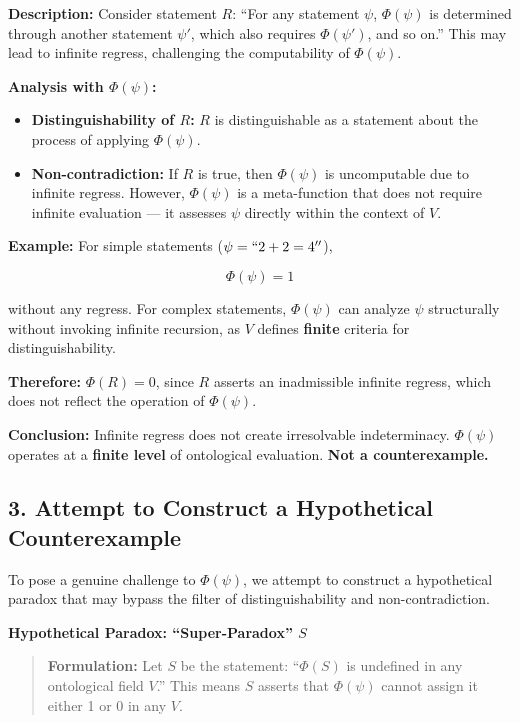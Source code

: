 \documentclass[12pt]{article}
\begin{document}
\textbf{Description:}  
Consider statement $R$: ``For any statement $\psi$, $\Phi(\psi)$ is determined through another statement $\psi'$, which also requires $\Phi(\psi')$, and so on.''  
This may lead to infinite regress, challenging the computability of $\Phi(\psi)$.

\textbf{Analysis with $\Phi(\psi)$:}

\begin{itemize}
\item \textbf{Distinguishability of $R$:} $R$ is distinguishable as a statement about the process of applying $\Phi(\psi)$.
\item \textbf{Non-contradiction:} If $R$ is true, then $\Phi(\psi)$ is uncomputable due to infinite regress.  
However, $\Phi(\psi)$ is a meta-function that does not require infinite evaluation — it assesses $\psi$ directly within the context of $V$.
\end{itemize}

\textbf{Example:} For simple statements ($\psi = ``2 + 2 = 4''$),

\[
\Phi(\psi) = 1
\]

without any regress. For complex statements, $\Phi(\psi)$ can analyze $\psi$ structurally without invoking infinite recursion, as $V$ defines \textbf{finite} criteria for distinguishability.

\textbf{Therefore:} $\Phi(R) = 0$, since $R$ asserts an inadmissible infinite regress, which does not reflect the operation of $\Phi(\psi)$.

\textbf{Conclusion:} Infinite regress does not create irresolvable indeterminacy. $\Phi(\psi)$ operates at a \textbf{finite level} of ontological evaluation. \textbf{Not a counterexample.}

\subsection*{3. Attempt to Construct a Hypothetical Counterexample}

To pose a genuine challenge to $\Phi(\psi)$, we attempt to construct a hypothetical paradox that may bypass the filter of distinguishability and non-contradiction.

\textbf{Hypothetical Paradox: ``Super-Paradox'' $S$}

\begin{quote}
\textbf{Formulation:} Let $S$ be the statement: ``$\Phi(S)$ is undefined in any ontological field $V$.''
This means $S$ asserts that $\Phi(\psi)$ cannot assign it either 1 or 0 in any $V$.
\end{quote}
\end{document}
